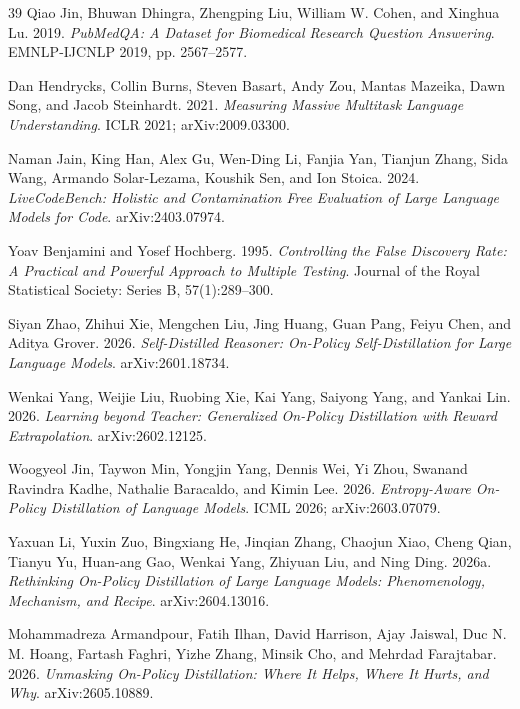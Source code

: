 \documentclass{article}
\begin{document}
\begin{thebibliography}{39}
 Qiao Jin, Bhuwan Dhingra, Zhengping Liu, William W. Cohen, and Xinghua Lu. 2019. \emph{PubMedQA: A Dataset for Biomedical Research Question Answering}. EMNLP-IJCNLP 2019, pp. 2567--2577.

 Dan Hendrycks, Collin Burns, Steven Basart, Andy Zou, Mantas Mazeika, Dawn Song, and Jacob Steinhardt. 2021. \emph{Measuring Massive Multitask Language Understanding}. ICLR 2021; arXiv:2009.03300.

 Naman Jain, King Han, Alex Gu, Wen-Ding Li, Fanjia Yan, Tianjun Zhang, Sida Wang, Armando Solar-Lezama, Koushik Sen, and Ion Stoica. 2024. \emph{LiveCodeBench: Holistic and Contamination Free Evaluation of Large Language Models for Code}. arXiv:2403.07974.

 Yoav Benjamini and Yosef Hochberg. 1995. \emph{Controlling the False Discovery Rate: A Practical and Powerful Approach to Multiple Testing}. Journal of the Royal Statistical Society: Series B, 57(1):289--300.

 Siyan Zhao, Zhihui Xie, Mengchen Liu, Jing Huang, Guan Pang, Feiyu Chen, and Aditya Grover. 2026. \emph{Self-Distilled Reasoner: On-Policy Self-Distillation for Large Language Models}. arXiv:2601.18734.

 Wenkai Yang, Weijie Liu, Ruobing Xie, Kai Yang, Saiyong Yang, and Yankai Lin. 2026. \emph{Learning beyond Teacher: Generalized On-Policy Distillation with Reward Extrapolation}. arXiv:2602.12125.

 Woogyeol Jin, Taywon Min, Yongjin Yang, Dennis Wei, Yi Zhou, Swanand Ravindra Kadhe, Nathalie Baracaldo, and Kimin Lee. 2026. \emph{Entropy-Aware On-Policy Distillation of Language Models}. ICML 2026; arXiv:2603.07079.

 Yaxuan Li, Yuxin Zuo, Bingxiang He, Jinqian Zhang, Chaojun Xiao, Cheng Qian, Tianyu Yu, Huan-ang Gao, Wenkai Yang, Zhiyuan Liu, and Ning Ding. 2026a. \emph{Rethinking On-Policy Distillation of Large Language Models: Phenomenology, Mechanism, and Recipe}. arXiv:2604.13016.

 Mohammadreza Armandpour, Fatih Ilhan, David Harrison, Ajay Jaiswal, Duc N. M. Hoang, Fartash Faghri, Yizhe Zhang, Minsik Cho, and Mehrdad Farajtabar. 2026. \emph{Unmasking On-Policy Distillation: Where It Helps, Where It Hurts, and Why}. arXiv:2605.10889.


\end{thebibliography}
\end{document}
